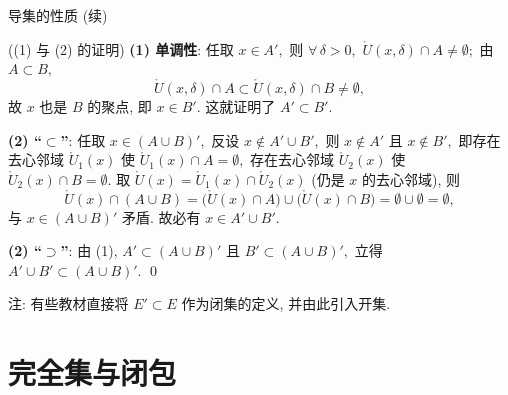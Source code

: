 \begin{frame}{导集的性质 (续)}

\startproof[bg=yellow, fg=red]((1) 与 (2) 的证明)
\textbf{(1) 单调性}: 任取 $x \in A',$ 则 $\forall\, \delta > 0,$ $\mathring{U}(x, \delta) \cap A \neq \emptyset;$ 由 $A \subset B,$
\[
\mathring{U}(x, \delta) \cap A \subset \mathring{U}(x, \delta) \cap B \neq \emptyset,
\]
故 $x$ 也是 $B$ 的聚点, 即 $x \in B'.$ 这就证明了 $A' \subset B'.$

\pause

\textbf{(2) ``$\subset$''}: 任取 $x \in (A \cup B)',$ 反设 $x \notin A' \cup B',$ 则 $x \notin A'$ 且 $x \notin B',$ 即存在去心邻域 $\mathring{U}_1(x)$ 使 $\mathring{U}_1(x) \cap A = \emptyset,$ 存在去心邻域 $\mathring{U}_2(x)$ 使 $\mathring{U}_2(x) \cap B = \emptyset.$ 取 $\mathring{U}(x) = \mathring{U}_1(x) \cap \mathring{U}_2(x)$ (仍是 $x$ 的去心邻域), 则
\[
\mathring{U}(x) \cap (A \cup B) = \bigl(\mathring{U}(x) \cap A\bigr) \cup \bigl(\mathring{U}(x) \cap B\bigr) = \emptyset \cup \emptyset = \emptyset,
\]
与 $x \in (A \cup B)'$ 矛盾. 故必有 $x \in A' \cup B'.$

\pause

\textbf{(2) ``$\supset$''}: 由 (1), $A' \subset (A \cup B)'$ 且 $B' \subset (A \cup B)',$ 立得 $A' \cup B' \subset (A \cup B)'.$
\qed

\begin{remark}
注: 有些教材直接将 $E' \subset E$ 作为闭集的定义, 并由此引入开集.
\end{remark}

\end{frame}


\section[完全集]{完全集与闭包}


